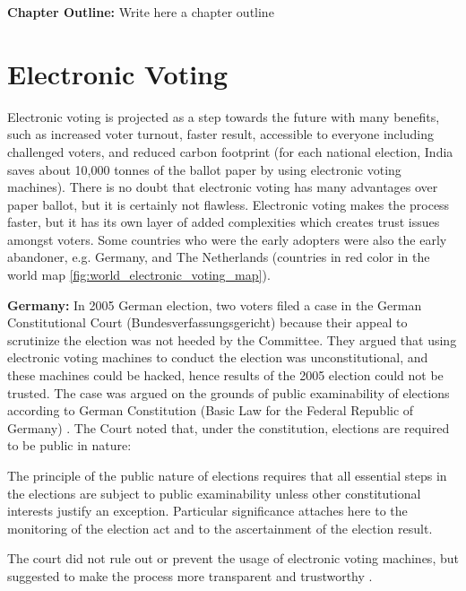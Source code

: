  
\textbf{Chapter Outline:}
  Write here a chapter outline

\section{Electronic Voting}
  Electronic voting is projected as a step towards the future with 
  many benefits, such as increased voter turnout, faster result, 
  accessible to everyone including challenged voters, and reduced 
  carbon footprint (for each 
  national election, India saves about 10,000 tonnes of the ballot 
  paper by using electronic voting machines).
  There is no doubt that electronic voting has many advantages 
  over paper ballot, but it is certainly not flawless.  
  Electronic voting makes 
  the process faster, but it has its own layer of added complexities 
  which creates trust issues amongst voters. Some countries 
  who were the early adopters were also the early abandoner, e.g.
  Germany, and The Netherlands (countries in red color in the world map 
  \ref{fig:world_electronic_voting_map}).
  
  
  \textbf{Germany:} In 2005 German election, two voters filed a case in the German 
  Constitutional Court (Bundesverfassungsgericht) because their 
  appeal to scrutinize the election 
  was not heeded by the Committee. They argued that using electronic 
  voting machines to conduct the election was unconstitutional, and 
  these machines could be hacked, hence results of the 2005 election 
  could not be trusted. The case was argued on the grounds 
  of public examinability of elections according to German Constitution 
  (Basic Law for the Federal Republic of Germany) \citep{Germanconst}. 
  The Court noted that, under the constitution, elections are 
  required to be public in nature:\citep{Germanconst}
  
  \begin{displayquote}
  The principle of the public nature of elections requires that all 
  essential steps in the elections are subject to public examinability
  unless other constitutional interests justify an exception. 
  Particular significance attaches here to the monitoring of the 
  election act and to the ascertainment of the election result.
  \end{displayquote}
  
 
 
  \noindent	
  The court did not rule out or prevent the usage of electronic 
  voting machines,  but suggested to make the process more 
  transparent and trustworthy \citep{Germanconst}.  
  
